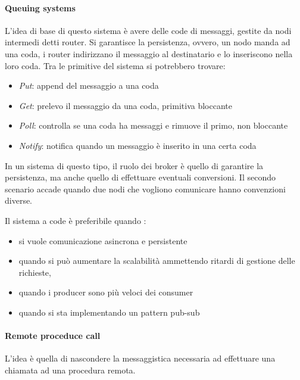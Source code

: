 \paragraph{Queuing systems}
L'idea di base di questo sistema è avere delle code di messaggi, gestite 
da nodi intermedi detti router. 
Si garantisce la persistenza, ovvero, un nodo manda ad una coda, i router 
indirizzano il messaggio al destinatario e lo inseriscono nella loro coda.
Tra le primitive del sistema si potrebbero trovare:
\begin{itemize}
    \item \emph{Put}: append del messaggio a una coda
    \item \emph{Get}: prelevo il messaggio da una coda, primitiva bloccante
    \item \emph{Poll}: controlla se una coda ha messaggi e rimuove il primo, non bloccante
    \item \emph{Notify}: notifica quando un messaggio è inserito in una certa coda
\end{itemize}
In un sistema di questo tipo, il ruolo dei broker è quello di garantire la persistenza, 
ma anche quello di effettuare eventuali conversioni. Il secondo scenario accade quando 
due nodi che vogliono comunicare hanno convenzioni diverse. 

Il sistema a code è preferibile quando :
\begin{itemize}
    \item si vuole comunicazione asincrona e persistente 
    \item quando si può aumentare la scalabilità ammettendo ritardi di gestione delle richieste, 
    \item quando i producer sono più veloci dei consumer
    \item quando si sta implementando un pattern pub-sub
\end{itemize}

\paragraph{Remote proceduce call}
L'idea è quella di nascondere la messaggistica necessaria ad effettuare una 
chiamata ad una procedura remota.

